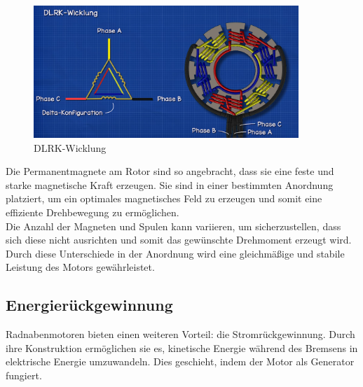 \begin{figure}[h]
    \centering
    \includegraphics[width=10cm]{images/DLRK-Wicklung.png}
    \caption{DLRK-Wicklung\cite{ingenieursmentalitat_burstenloser_2022}}%
    \label{fig:12}
\end{figure}

Die Permanentmagnete am Rotor sind so angebracht, dass sie eine feste und starke magnetische Kraft erzeugen.
Sie sind in einer bestimmten Anordnung platziert, um ein optimales magnetisches Feld zu erzeugen und somit eine effiziente Drehbewegung zu ermöglichen.\\
Die Anzahl der Magneten und Spulen kann variieren, um sicherzustellen, dass sich diese nicht ausrichten und somit das gewünschte Drehmoment erzeugt wird.
Durch diese Unterschiede in der Anordnung wird eine gleichmäßige und stabile Leistung des Motors gewährleistet.\\







\subsection{Energierückgewinnung}\label{subsec:energieruckgewinnung}

Radnabenmotoren bieten einen weiteren Vorteil: die Stromrückgewinnung.
Durch ihre Konstruktion ermöglichen sie es, kinetische Energie während des Bremsens in elektrische Energie umzuwandeln.
Dies geschieht, indem der Motor als Generator fungiert.\\

